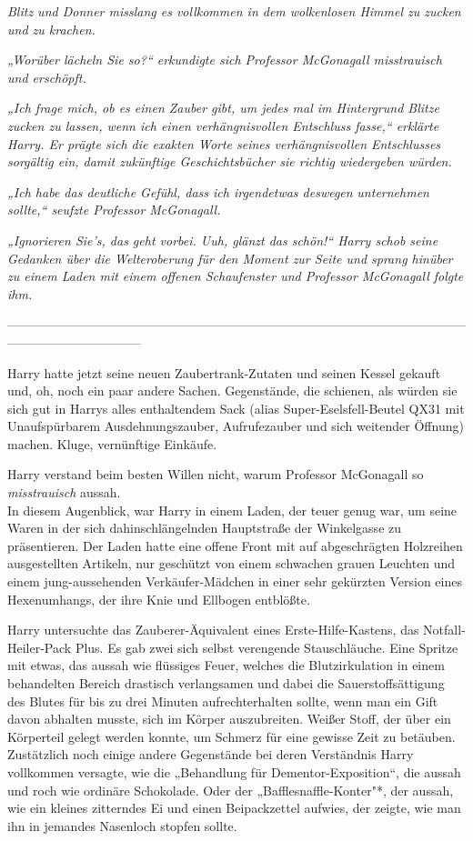 {\emph{Blitz und Donner misslang es vollkommen in dem wolkenlosen Himmel zu zucken und zu krachen.}

\emph{„Worüber lächeln Sie so?“ erkundigte sich Professor McGonagall misstrauisch und erschöpft.}

\emph{„Ich frage mich, ob es einen Zauber gibt, um jedes mal im Hintergrund Blitze zucken zu lassen, wenn ich einen verhängnisvollen Entschluss fasse,“ erklärte Harry. Er prägte sich die exakten Worte seines verhängnisvollen Entschlusses sorgältig ein, damit zukünftige Geschichtsbücher sie richtig wiedergeben würden.}

\emph{„Ich habe das deutliche Gefühl, dass ich irgendetwas deswegen} \emph{unternehmen sollte,“ seufzte Professor McGonagall.}

\emph{„Ignorieren Sie's, das geht vorbei. Uuh, glänzt das schön!“ Harry schob seine Gedanken über die Welteroberung für den Moment zur Seite und sprang hinüber zu einem Laden mit einem offenen Schaufenster und Professor McGonagall folgte ihm.}

--------------------------------------------------------------------------------------------------------------------------------------------

\hfill\break Harry hatte jetzt seine neuen Zaubertrank-Zutaten und seinen Kessel gekauft und, oh, noch ein paar andere Sachen. Gegenstände, die schienen, als würden sie sich gut in Harrys alles enthaltendem Sack (alias Super-Eselsfell-Beutel QX31 mit Unaufspürbarem Ausdehnungszauber, Aufrufezauber und sich weitender Öffnung) machen. Kluge, vernünftige Einkäufe.

Harry verstand beim besten Willen nicht, warum Professor McGonagall so \emph{misstrauisch} aussah.\\ In diesem Augenblick, war Harry in einem Laden, der teuer genug war, um seine Waren in der sich dahinschlängelnden Hauptstraße der Winkelgasse zu präsentieren. Der Laden hatte eine offene Front mit auf abgeschrägten Holzreihen ausgestellten Artikeln, nur geschützt von einem schwachen grauen Leuchten und einem jung-aussehenden Verkäufer-Mädchen in einer sehr gekürzten Version eines Hexenumhangs, der ihre Knie und Ellbogen entblößte.

Harry untersuchte das Zauberer-Äquivalent eines Erste-Hilfe-Kastens, das Notfall-Heiler-Pack Plus. Es gab zwei sich selbst verengende Stauschläuche. Eine Spritze mit etwas, das aussah wie flüssiges Feuer, welches die Blutzirkulation in einem behandelten Bereich drastisch verlangsamen und dabei die Sauerstoffsättigung des Blutes für bis zu drei Minuten aufrechterhalten sollte, wenn man ein Gift davon abhalten musste, sich im Körper auszubreiten. Weißer Stoff, der über ein Körperteil gelegt werden konnte, um Schmerz für eine gewisse Zeit zu betäuben. Zustätzlich noch einige andere Gegenstände bei deren Verständnis Harry vollkommen versagte, wie die „Behandlung für Dementor-Exposition“, die aussah und roch wie ordinäre Schokolade. Oder der „Bafflesnaffle-Konter"*, der aussah, wie ein kleines zitterndes Ei und einen Beipackzettel aufwies, der zeigte, wie man ihn in jemandes Nasenloch stopfen sollte.

}
